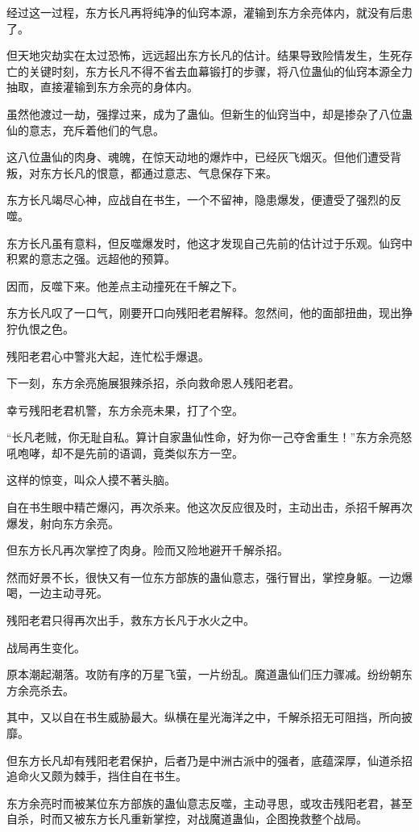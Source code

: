 \begin{this_body}
经过这一过程，东方长凡再将纯净的仙窍本源，灌输到东方余亮体内，就没有后患了。

但天地灾劫实在太过恐怖，远远超出东方长凡的估计。结果导致险情发生，生死存亡的关键时刻，东方长凡不得不省去血幕锻打的步骤，将八位蛊仙的仙窍本源全力抽取，直接灌输到东方余亮的身体内。

虽然他渡过一劫，强撑过来，成为了蛊仙。但新生的仙窍当中，却是掺杂了八位蛊仙的意志，充斥着他们的气息。

这八位蛊仙的肉身、魂魄，在惊天动地的爆炸中，已经灰飞烟灭。但他们遭受背叛，对东方长凡的恨意，都通过意志、气息保存下来。

东方长凡竭尽心神，应战自在书生，一个不留神，隐患爆发，便遭受了强烈的反噬。

东方长凡虽有意料，但反噬爆发时，他这才发现自己先前的估计过于乐观。仙窍中积累的意志之强。远超他的预算。

因而，反噬下来。他差点主动撞死在千解之下。

东方长凡叹了一口气，刚要开口向残阳老君解释。忽然间，他的面部扭曲，现出狰狞仇恨之色。

残阳老君心中警兆大起，连忙松手爆退。

下一刻，东方余亮施展狠辣杀招，杀向救命恩人残阳老君。

幸亏残阳老君机警，东方余亮未果，打了个空。

“长凡老贼，你无耻自私。算计自家蛊仙性命，好为你一己夺舍重生！”东方余亮怒吼咆哮，却不是先前的语调，竟类似东方一空。

这样的惊变，叫众人摸不著头脑。

自在书生眼中精芒爆闪，再次杀来。他这次反应很及时，主动出击，杀招千解再次爆发，射向东方余亮。

但东方长凡再次掌控了肉身。险而又险地避开千解杀招。

然而好景不长，很快又有一位东方部族的蛊仙意志，强行冒出，掌控身躯。一边爆喝，一边主动寻死。

残阳老君只得再次出手，救东方长凡于水火之中。

战局再生变化。

原本潮起潮落。攻防有序的万星飞萤，一片纷乱。魔道蛊仙们压力骤减。纷纷朝东方余亮杀去。

其中，又以自在书生威胁最大。纵横在星光海洋之中，千解杀招无可阻挡，所向披靡。

但东方长凡却有残阳老君保护，后者乃是中洲古派中的强者，底蕴深厚，仙道杀招追命火又颇为棘手，挡住自在书生。

东方余亮时而被某位东方部族的蛊仙意志反噬，主动寻思，或攻击残阳老君，甚至自杀，时而又被东方长凡重新掌控，对战魔道蛊仙，企图挽救整个战局。


\end{this_body}
